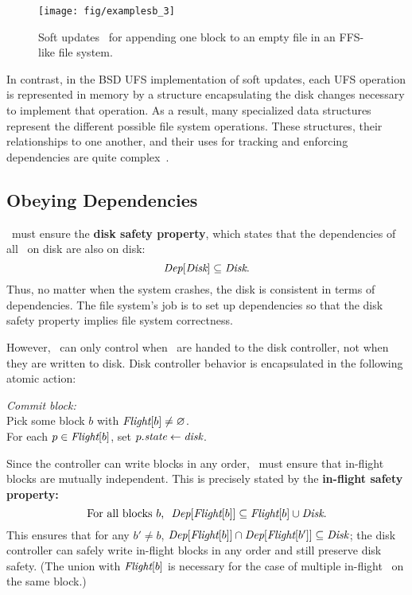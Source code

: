 \begin{figure}[htb]
  \centering
  \texttt{[image: fig/examplesb\_3]}
  \caption{\label{fig:softupdate} Soft updates \patches\
  for appending one block to an empty file in an FFS-like file system.}
\end{figure}

In contrast, in the BSD UFS implementation of soft updates, each UFS operation
is represented in memory by a structure encapsulating the disk changes necessary
to implement that operation. As a result, many specialized data structures
represent the different possible file system operations. These structures, their
relationships to one another, and their uses for tracking and enforcing
dependencies are quite complex~\cite{mckusick99soft}.


\subsection{Obeying Dependencies}
\label{sec:patch:dependencies}

\Kudos\ must ensure the \textbf{disk safety property}, which states that
 the dependencies of all \patches\ on disk are also on disk:
%
\[ \PDepset{\PDisk} \subseteq \PDisk. \]
%
Thus, no matter when the system crashes, the disk is consistent in terms of
dependencies.
%
The file system's job is to set up dependencies so that the disk safety
property implies file system correctness.

However, \Kudos\ can only control when \patches\ are handed to the disk
 controller, not when they are written to disk.
%
Disk controller behavior is encapsulated in the following atomic action:

\begin{tabbing}
\textit{Commit block:} \\
\quad Pick some block $b$ with $\PInf[b] \neq \emptyset$. \\
\quad For each $p \in \PInf[b]$, set $p.\textit{state} \gets \textit{disk}$.
\end{tabbing}

\noindent
%
Since the controller can write blocks in any order, \Kudos\ must ensure
that in-flight blocks are mutually independent.  This is precisely stated
by the \textbf{in-flight safety property:}
%
\[ \text{For all blocks $b$,~~} \PDepset{\PInf[b]} \subseteq \PInf[b] \cup \PDisk . \]
%
This ensures that for any $b' \neq b$, $\PDepset{\PInf[b]} \cap
 \PDepset{\PInf[b']} \subseteq \PDisk$; the disk controller can safely
 write in-flight blocks in any order and still preserve disk safety.
%
(The union with $\PInf[b]$ is necessary for the case of multiple in-flight
\patches\ on the same block.)


